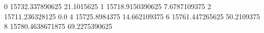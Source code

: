 0 15732.337890625 21.1015625
1 15718.9150390625 7.6787109375
2 15711.236328125 0.0
4 15725.8984375 14.662109375
6 15761.447265625 50.2109375
8 15780.4638671875 69.2275390625
